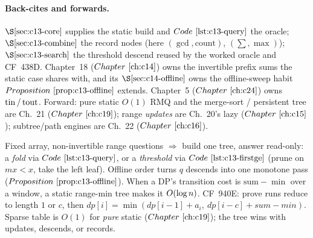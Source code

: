 \paragraph{Back-cites and forwards.}
\(\secref{c13-core}\) supplies the static build and \(\coderef{c13-query}\) the
oracle; \(\secref{c13-combine}\) the record nodes (here \((\gcd,\text{count})\),
\((\sum,\max)\)); \(\secref{c13-search}\) the threshold descend reused by the
worked oracle and CF~438D.  Chapter~18 (\(\chref{c14}\)) owns the invertible
prefix sums the static case shares with, and its \(\secref{c14-offline}\) owns the
offline-sweep habit \(\propref{c13-offline}\) extends.  Chapter~5 (\(\chref{c24}\))
owns \(\operatorname{tin}/\operatorname{tout}\).  Forward: pure static \(O(1)\) RMQ and the merge-sort /
persistent tree are Ch.~21 (\(\chref{c19}\)); range \emph{updates} are Ch.~20's
lazy (\(\chref{c15}\)); subtree/path engines are Ch.~22 (\(\chref{c16}\)).

\begin{recallbox}
Fixed array, non-invertible range questions \(\Rightarrow\) build one tree,
answer read-only: a \emph{fold} via \(\coderef{c13-query}\), or a
\emph{threshold} via \(\coderef{c13-firstge}\) (prune on \(\mathit{mx}<x\), take
the left leaf).  Offline order turns \(q\) descends into one monotone pass
(\(\propref{c13-offline}\)).  When a DP's transition cost is \(\text{sum}-\min\)
over a window, a static range-min tree makes it \(O(\log n)\).  CF~940E:
prove runs reduce to length \(1\) or \(c\), then
\(\mathit{dp}[i]=\min(\mathit{dp}[i{-}1]{+}a_i,\ \mathit{dp}[i{-}c]{+}\mathit{sum}{-}\mathit{min})\).
Sparse table is \(O(1)\) for \emph{pure} static (\(\chref{c19}\)); the tree wins
with updates, descends, or records.
\end{recallbox}
